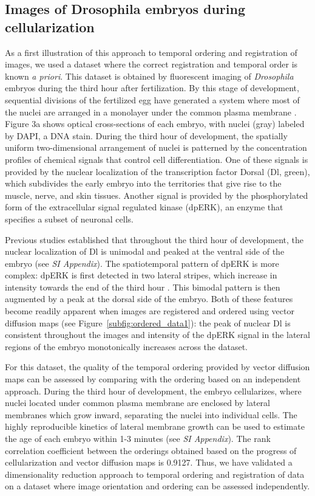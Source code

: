 \documentclass{pnastwo}
\begin{document}
\begin{article}
\subsection{Images of {\subsectionitfont Drosophila} embryos during cellularization}

As a first illustration of this approach to temporal ordering and registration of images, we used a dataset where the correct registration and temporal order is known {\it a priori}. 
%
This dataset is obtained by fluorescent imaging of {\it Drosophila} embryos during the third hour after fertilization.
%
By this stage of development, sequential divisions of the fertilized egg have generated a system where most of the nuclei are arranged in a monolayer under the common plasma membrane \cite{foe1983studies}. 
%
Figure 3a shows optical cross-sections of each embryo, with nuclei (gray) labeled by DAPI, a DNA stain. 
%
During the third hour of development, the spatially uniform two-dimensional arrangement of nuclei is patterned by the concentration profiles of chemical signals that control cell differentiation.
%
One of these signals is provided by the nuclear localization of the transcription factor Dorsal (Dl, green), which subdivides the early embryo into the territories that give rise to the muscle, nerve, and skin tissues.
%
Another signal is provided by the phosphorylated form of the extracellular signal regulated kinase (dpERK), an enzyme that specifies a subset of neuronal cells. 
%

Previous studies \cite{rushlow2012temporal} established that throughout the third hour of development, the nuclear localization of Dl is unimodal and peaked at the ventral side of the embryo (see {\it SI Appendix}). 
%
The spatiotemporal pattern of dpERK is more complex: dpERK is first detected in two lateral stripes, which increase in intensity towards the end of the third hour \cite{lim2013kinetics}.  
%
This bimodal pattern is then augmented by a peak at the dorsal side of the embryo.
%
Both of these features become readily apparent when images are registered and ordered using vector diffusion maps (see Figure~\ref{subfig:ordered_data1}): the peak of nuclear Dl is consistent throughout the images and intensity of the dpERK signal in the lateral regions of the embryo monotonically increases across the dataset.
%

For this dataset, the quality of the temporal ordering provided by vector diffusion maps can be assessed by comparing with the ordering based on an independent approach.
%
During the third hour of development, the embryo cellularizes, where nuclei located under common plasma membrane are enclosed by lateral membranes which grow inward, separating the nuclei into individual cells.
%
The highly reproducible kinetics of lateral membrane growth can be used to estimate the age of each embryo within 1-3 minutes \cite{figard2013plasma} (see {\it SI Appendix}).    
%
The rank correlation coefficient between the orderings obtained based on the progress of cellularization and vector diffusion maps is 0.9127. 
%
Thus, we have validated a dimensionality reduction approach to temporal ordering and registration of data on a dataset where image orientation and ordering can be assessed independently. 


\end{article}
\end{document}
